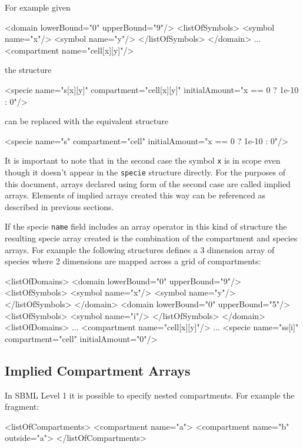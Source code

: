 \documentclass{cekarticle}
\begin{document}
For example given
\begin{example}
<domain lowerBound="0" upperBound="9"/>
    <listOfSymbols>
        <symbol name="x"/>
        <symbol name="y"/>
    </listOfSymbols>
</domain>
...
<compartment name="cell[x][y]"/>
\end{example}
the structure
\begin{example}
<specie name="s[x][y]" compartment="cell[x][y]" initialAmount="x == 0 ? 1e-10 : 0"/>
\end{example}
can be replaced with the equivalent structure
\begin{example}
<specie name="s" compartment="cell" initialAmount="x == 0 ? 1e-10 : 0"/>
\end{example}

It is important to note that in the second case the symbol
\texttt{x} is in scope even though it doesn't appear in the
\texttt{specie} structure directly.  For the purposes of this
document, arrays declared using form of the second case are called
implied arrays. Elements of implied arrays created this way can
be referenced as described in previous sections.

If the specie \texttt{name} field includes an array operator in this kind of
structure the resulting specie array created is the combination
of the compartment and species arrays.  For example the following structures defines a 3
dimension array of species where 2 dimensions are mapped across a
grid of compartments:
\begin{example}
<listOfDomains>
    <domain lowerBound="0" upperBound="9"/>
        <listOfSymbols>
            <symbol name="x"/>
            <symbol name="y"/>
        </listOfSymbols>
    </domain>
    <domain lowerBound="0" upperBound="5"/>
        <listOfSymbols>
            <symbol name="i"/>
        </listOfSymbols>
    </domain>
<listOfDomains>
...
<compartment name="cell[x][y]"/>
...
<specie name="ss[i]" compartment="cell" initialAmount="0"/>
\end{example}

\subsection{Implied Compartment Arrays}

In SBML Level 1 it is possible to specify nested compartments.
For example the fragment:

\begin{example}
<listOfCompartments>
    <compartment name="a">
    <compartment name="b" outside="a">
</listOfCompartments>
\end{example}
\end{document}
